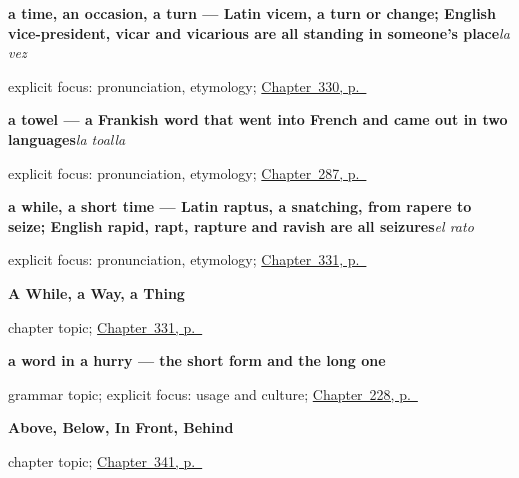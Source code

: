 \noindent\begin{minipage}[t]{\linewidth}
\raggedright
\textbf{a time, an occasion, a turn — Latin vicem, a turn or change; English vice-president, vicar and vicarious are all standing in someone's place}\enspace\emph{la vez}\par
\footnotesize explicit focus: pronunciation, etymology; \hyperref[ch:camino-y-vez]{Chapter~330, p.~\pageref*{ch:camino-y-vez}}
\end{minipage}\par\smallskip

\noindent\begin{minipage}[t]{\linewidth}
\raggedright
\textbf{a towel — a Frankish word that went into French and came out in two languages}\enspace\emph{la toalla}\par
\footnotesize explicit focus: pronunciation, etymology; \hyperref[ch:cinco-cosas]{Chapter~287, p.~\pageref*{ch:cinco-cosas}}
\end{minipage}\par\smallskip

\noindent\begin{minipage}[t]{\linewidth}
\raggedright
\textbf{a while, a short time — Latin raptus, a snatching, from rapere to seize; English rapid, rapt, rapture and ravish are all seizures}\enspace\emph{el rato}\par
\footnotesize explicit focus: pronunciation, etymology; \hyperref[ch:manera-y-asunto]{Chapter~331, p.~\pageref*{ch:manera-y-asunto}}
\end{minipage}\par\smallskip

\noindent\begin{minipage}[t]{\linewidth}
\raggedright
\textbf{A While, a Way, a Thing}\par
\footnotesize chapter topic; \hyperref[ch:manera-y-asunto]{Chapter~331, p.~\pageref*{ch:manera-y-asunto}}
\end{minipage}\par\smallskip

\noindent\begin{minipage}[t]{\linewidth}
\raggedright
\textbf{a word in a hurry — the short form and the long one}\par
\footnotesize grammar topic; explicit focus: usage and culture; \hyperref[ch:mal]{Chapter~228, p.~\pageref*{ch:mal}}
\end{minipage}\par\smallskip

\noindent\begin{minipage}[t]{\linewidth}
\raggedright
\textbf{Above, Below, In Front, Behind}\par
\footnotesize chapter topic; \hyperref[ch:arriba-y-abajo]{Chapter~341, p.~\pageref*{ch:arriba-y-abajo}}
\end{minipage}\par\smallskip

